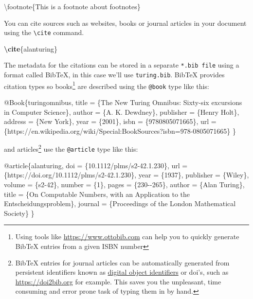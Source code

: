 \documentclass[
]{book}
\newenvironment{Shaded}{\begin{snugshade}}{\end{snugshade}}
\newcommand{\ExtensionTok}[1]{#1}
\newcommand{\FunctionTok}[1]{\textcolor[rgb]{0.00,0.00,0.00}{#1}}
\newcommand{\KeywordTok}[1]{\textcolor[rgb]{0.13,0.29,0.53}{\textbf{#1}}}
\newcommand{\NormalTok}[1]{#1}
\begin{document}
\begin{Shaded}
\begin{Highlighting}[]
\FunctionTok{\textbackslash{}footnote}\NormalTok{\{This is a footnote about footnotes\}}
\end{Highlighting}
\end{Shaded}

You can cite sources such as websites, books or journal articles in your document using the \texttt{\textbackslash{}cite} command.

\begin{Shaded}
\begin{Highlighting}[]
\KeywordTok{\textbackslash{}cite}\NormalTok{\{}\ExtensionTok{alanturing}\NormalTok{\}}
\end{Highlighting}
\end{Shaded}

The metadata for the citations can be stored in a separate \texttt{*.bib\ file} using a format called BibTeX, in this case we'll use \texttt{turing.bib}. BibTeX provides citation types so books\footnote{Using tools like \url{https://www.ottobib.com} can help you to quickly generate BibTeX entries from a given ISBN number} are described using the \texttt{@book} type like this:

\begin{Shaded}
\begin{Highlighting}[]
\NormalTok{@Book\{turingomnibus,}
\NormalTok{  title = \{The New Turing Omnibus: Sixty{-}six excursions in Computer Science\},}
\NormalTok{  author = \{A. K. Dewdney\},}
\NormalTok{  publisher = \{Henry Holt\},}
\NormalTok{  address = \{New York\},}
\NormalTok{  year = \{2001\},}
\NormalTok{  isbn = \{9780805071665\},}
\NormalTok{  url = \{https://en.wikipedia.org/wiki/Special:BookSources?isbn=978{-}0805071665\}}
\NormalTok{\}}
\end{Highlighting}
\end{Shaded}

and articles\footnote{BibTeX entries for journal articles can be automatically generated from persistent identifiers known as \href{https://en.wikipedia.org/wiki/Digital_object_identifier}{digital object identifiers} or doi's, such as \url{https://doi2bib.org} for example. This saves you the unpleasant, time consuming and error prone task of typing them in by hand.} use the \texttt{@article} type like this:

\begin{Shaded}
\begin{Highlighting}[]
\NormalTok{@article\{alanturing,}
\NormalTok{  doi = \{10.1112/plms/s2{-}42.1.230\},}
\NormalTok{  url = \{https://doi.org/10.1112/plms/s2{-}42.1.230\},}
\NormalTok{  year = \{1937\},}
\NormalTok{  publisher = \{Wiley\},}
\NormalTok{  volume = \{s2{-}42\},}
\NormalTok{  number = \{1\},}
\NormalTok{  pages = \{230{-}{-}265\},}
\NormalTok{  author = \{Alan Turing\},}
\NormalTok{  title = \{On Computable Numbers, with an Application to the Entscheidungsproblem\},}
\NormalTok{  journal = \{Proceedings of the London Mathematical Society\}}
\NormalTok{\}}
\end{Highlighting}
\end{Shaded}
\end{document}
